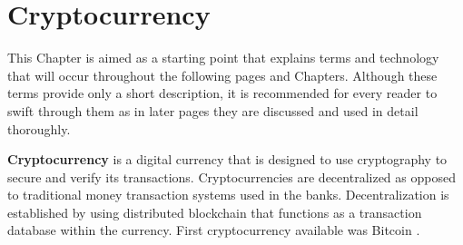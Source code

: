 \documentclass[
  printed, %
  table,   %
  lof,     %
  lot,     %
           oneside, color
]{fithesis3}
\begin{document}



\chapter{Cryptocurrency}
This Chapter is aimed as a starting point that explains terms and technology that will occur throughout the following pages and Chapters. Although these terms provide only a short description, it is recommended for every reader to swift through them as in later pages they are discussed and used in detail thoroughly.

\textbf{Cryptocurrency} is a digital currency that is designed to use cryptography to secure and verify its transactions. Cryptocurrencies are decentralized as opposed to traditional money transaction systems used in the banks. Decentralization is established by using distributed blockchain that functions as a transaction database within the currency. First cryptocurrency available was Bitcoin \cite{farell2015analysis}.
\end{document}
